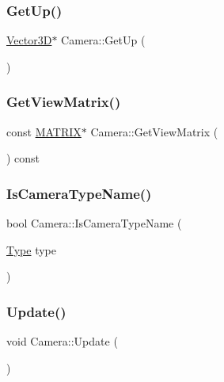 \subsubsection{\texorpdfstring{Get\+Up()}{GetUp()}}
{\footnotesize\ttfamily \mbox{\hyperlink{class_vector3_d}{Vector3D}}$\ast$ Camera\+::\+Get\+Up (\begin{DoxyParamCaption}{ }\end{DoxyParamCaption})\hspace{0.3cm}{\ttfamily [inline]}}

\mbox{\label{class_camera_aa472374f61480c5a9dff89d30be029f4}} 
\subsubsection{\texorpdfstring{Get\+View\+Matrix()}{GetViewMatrix()}}
{\footnotesize\ttfamily const \mbox{\hyperlink{_vector3_d_8h_a032295cd9fb1b711757c90667278e744}{M\+A\+T\+R\+IX}}$\ast$ Camera\+::\+Get\+View\+Matrix (\begin{DoxyParamCaption}{ }\end{DoxyParamCaption}) const\hspace{0.3cm}{\ttfamily [inline]}}

\mbox{\label{class_camera_af1bd90387ddb83c2af82e92e3fc472af}} 
\subsubsection{\texorpdfstring{Is\+Camera\+Type\+Name()}{IsCameraTypeName()}}
{\footnotesize\ttfamily bool Camera\+::\+Is\+Camera\+Type\+Name (\begin{DoxyParamCaption}\item[{\mbox{\hyperlink{class_camera_a3b0a1f58deca679ac665f61c480d1dcb}{Type}}}]{type }\end{DoxyParamCaption})}

\mbox{\label{class_camera_a4a596a3ea1fdc7d244ba4268031a360b}} 
\subsubsection{\texorpdfstring{Update()}{Update()}}
{\footnotesize\ttfamily void Camera\+::\+Update (\begin{DoxyParamCaption}{ }\end{DoxyParamCaption})}




